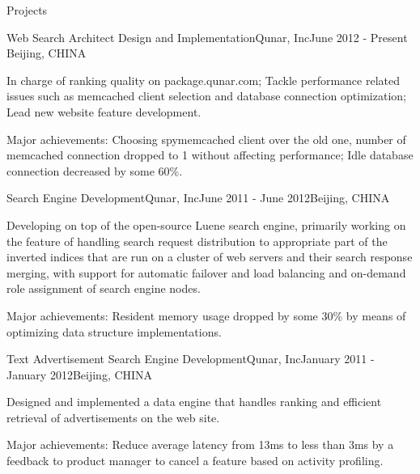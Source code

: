 \documentclass{resume} %
\begin{document}
\begin{rSection}{Projects}

\begin{rSubsection}{Web Search Architect Design and Implementation}{Qunar, Inc}{June 2012 - Present}
{Beijing, CHINA}
\item In charge of ranking quality on package.qunar.com; Tackle performance related issues such as memcached client
  selection and database connection optimization; Lead new website feature development.
\item Major achievements: Choosing spymemcached client over the old one, number of memcached connection dropped to 1 
without affecting performance; Idle database connection decreased by some 60\%.
\end{rSubsection}

\begin{rSubsection}{Search Engine Development}{Qunar, Inc}{June 2011 -
    June 2012}{Beijing, CHINA}
\item Developing on top of the open-source Luene search engine, primarily working on the feature of handling search
request distribution to appropriate part of the inverted indices that are run on a cluster of web servers and their
search response merging, with support for automatic failover and load balancing and on-demand role
assignment of search engine nodes.
\item Major achievements: Resident memory usage dropped by some 30\% by means of optimizing data structure implementations.
\end{rSubsection}

\begin{rSubsection}{Text Advertisement Search Engine
    Development}{Qunar, Inc}{January 2011 -
    January 2012}{Beijing, CHINA}
\item Designed and implemented a data engine that handles ranking and
  efficient retrieval of advertisements on the web site. 
\item Major achievements: Reduce average latency from 13ms to less than 3ms by a feedback to product manager
to cancel a feature based on activity profiling. 
\end{rSubsection}

\end{rSection}

\end{document}
